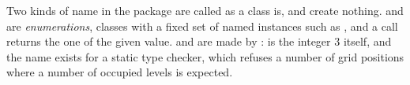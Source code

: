 \begin{remark}\label{remark.calledLikeAClass}
 Two kinds of name in the package are called as a class is, and create nothing.
  and  are \emph{enumerations},
 classes with a fixed set of named instances such as ,
 and a call returns the one of the given value.
  and  are made by :
  is the integer $3$ itself,
 and the name exists for a static type checker,
 which refuses a number of grid positions where a number of occupied levels is expected.
\end{remark}
